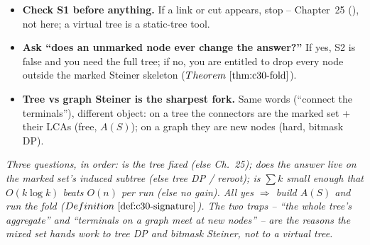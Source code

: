 \begin{hardeningbox}
\begin{itemize}[nosep,leftmargin=1.4em]
  \item \textbf{Check S1 before anything.} If a link or cut appears, stop -- Chapter~25
        (), not here; a virtual tree is a static-tree tool.
  \item \textbf{Ask ``does an unmarked node ever change the answer?''} If yes, S2 is
        false and you need the full tree; if no, you are entitled to drop every node
        outside the marked Steiner skeleton (\(\thmref{c30-fold}\)).
  \item \textbf{Tree vs graph Steiner is the sharpest fork.} Same words (``connect the
        terminals''), different object: on a tree the connectors are the marked set +
        their LCAs (free, \(A(S)\)); on a graph they are new nodes (hard, bitmask DP).
\end{itemize}
\end{hardeningbox}

\begin{recallbox}
\emph{Three questions, in order: is the tree fixed (else Ch.~25); does the answer live
on the marked set's induced subtree (else tree DP / reroot); is \(\sum k\) small enough
that \(O(k\log k)\) beats \(O(n)\) per run (else no gain).  All yes \(\Rightarrow\) build
\(A(S)\) and run the fold (\(\defref{c30-signature}\)).  The two traps -- ``the whole
tree's aggregate'' and ``terminals on a graph meet at new nodes'' -- are the reasons the
mixed set hands work to tree DP and bitmask Steiner, not to a virtual tree.}
\end{recallbox}
